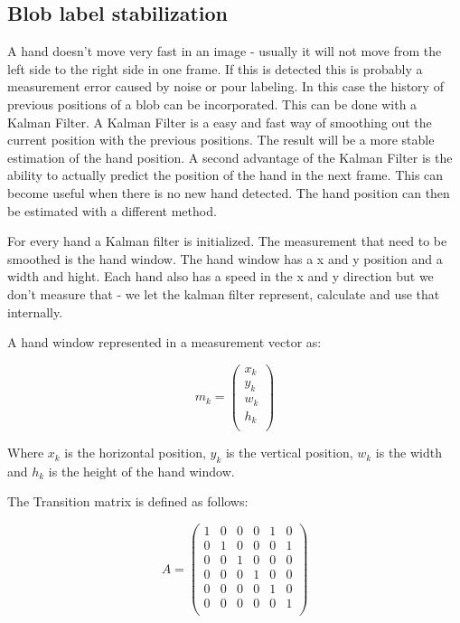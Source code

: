 \subsection*{Blob label stabilization}
A hand doesn't move very fast in an image - usually it will not move from the left side to the right side in one frame. If this is detected this is probably a measurement error caused by noise or pour labeling. In this case the history of previous positions of a blob can be incorporated. This can be done with a Kalman Filter. A Kalman Filter is a easy and fast way of smoothing out the current position with the previous positions. The result will be a more stable estimation of the hand position. A second advantage of the Kalman Filter is the ability to actually predict the position of the hand in the next frame. This can become useful when there is no new hand detected. The hand position can then be estimated with a different method.

For every hand a Kalman filter is initialized. The measurement that need to be smoothed is the hand window. The hand window has a x and y position and a width and hight. Each hand also has a speed in the x and y direction but we don't measure that - we let the kalman filter represent, calculate and use that internally. 

A hand window represented in a measurement vector as:

\begin{equation}
 m_k = \left(
\begin{array}{c}
	x_k \\ %
	y_k \\ %
	w_k \\ %
	h_k \\ %
\end{array} \right)
\end{equation}

Where $x_k$ is the horizontal position, $y_k$ is the vertical position, $w_k$ is the width and $h_k$ is the height of the hand window.

The Transition matrix is defined as follows:

\begin{equation}
 A = \left(
\begin{array}{cccccc}
	1 & 0 & 0 & 0 & 1 & 0 \\
	0 & 1 & 0 & 0 & 0 & 1 \\
	0 & 0 & 1 & 0 & 0 & 0 \\
	0 & 0 & 0 & 1 & 0 & 0 \\
	0 & 0 & 0 & 0 & 1 & 0 \\
	0 & 0 & 0 & 0 & 0 & 1 \\
\end{array} \right)
\end{equation}
	
